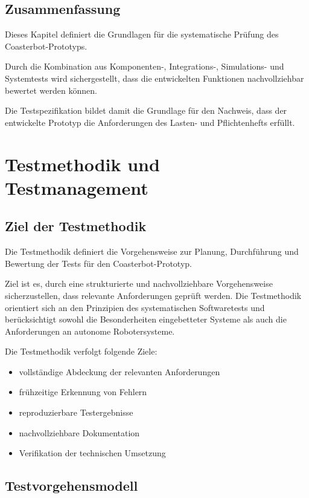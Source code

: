 \subsection{Zusammenfassung}\label{zusammenfassung}

Dieses Kapitel definiert die Grundlagen für die systematische Prüfung
des Coasterbot-Prototyps.

Durch die Kombination aus Komponenten-, Integrations-, Simulations- und
Systemtests wird sichergestellt, dass die entwickelten Funktionen
nachvollziehbar bewertet werden können.

Die Testspezifikation bildet damit die Grundlage für den Nachweis, dass
der entwickelte Prototyp die Anforderungen des Lasten- und
Pflichtenhefts erfüllt.

\section{Testmethodik und
Testmanagement}\label{testmethodik-und-testmanagement}

\subsection{Ziel der Testmethodik}\label{ziel-der-testmethodik}

Die Testmethodik definiert die Vorgehensweise zur Planung, Durchführung
und Bewertung der Tests für den Coasterbot-Prototyp.

Ziel ist es, durch eine strukturierte und nachvollziehbare
Vorgehensweise sicherzustellen, dass relevante Anforderungen geprüft
werden. Die Testmethodik orientiert sich an den Prinzipien des
systematischen Softwaretests und berücksichtigt sowohl die
Besonderheiten eingebetteter Systeme als auch die Anforderungen an
autonome Robotersysteme.

Die Testmethodik verfolgt folgende Ziele:

\begin{itemize}
\tightlist
\item
  vollständige Abdeckung der relevanten Anforderungen
\item
  frühzeitige Erkennung von Fehlern
\item
  reproduzierbare Testergebnisse
\item
  nachvollziehbare Dokumentation
\item
  Verifikation der technischen Umsetzung
\end{itemize}

\subsection{Testvorgehensmodell}\label{testvorgehensmodell}

